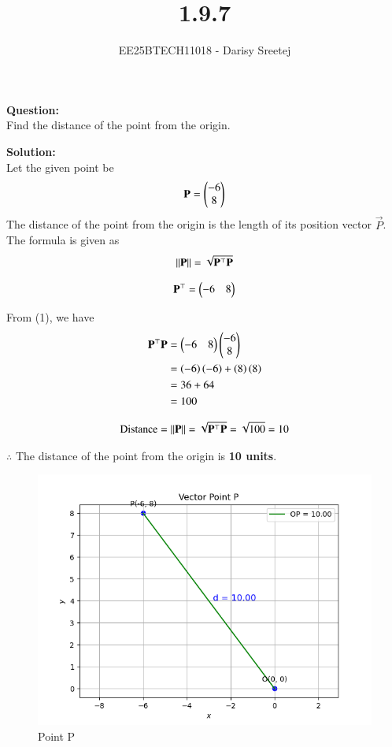 \documentclass[journal]{IEEEtran}
\begin{document}
\title{1.9.7}
\author{EE25BTECH11018 - Darisy Sreetej}
\maketitle

\textbf{Question:}\\
Find the distance of the point  from the origin.

\textbf{Solution:}\\
Let the given point be
\begin{align*}
    \mathbf{P} = \begin{pmatrix}-6 \\ 8\end{pmatrix}
\end{align*}
The distance of the point from the origin is the length of its position vector $\vec{P}$. The formula is given as 
\begin{align}
\left\lVert\mathbf{P}\right\rVert = \sqrt{\mathbf{P}^\top \mathbf{P}} \label{eq:1}
\end{align}

\begin{align*}
    \mathbf{P}^\top = \begin{pmatrix}-6 & 8\end{pmatrix}
\end{align*}

From (1), we have
\begin{align}
    \mathbf{P}^\top \mathbf{P} &= \begin{pmatrix}-6 & 8\end{pmatrix} \begin{pmatrix}-6 \\ 8\end{pmatrix} \\
    &= \left(-6\right)\left(-6\right) + \left(8\right)\left(8\right) \\
    &= 36 + 64 \\
    &= 100
\end{align}

\begin{align*}
    \text{Distance} = \left\lVert\mathbf{P}\right\rVert = \sqrt{\mathbf{P}^\top \mathbf{P}} = \sqrt{100} = 10
\end{align*}

$\therefore$ The distance of the point  from the origin is \textbf{10 units}.

\begin{figure}
    \centering
    \includegraphics[width=\columnwidth]{figs/fig.png}
    \caption*{Point P}
    \label{fig:fig}
\end{figure}
\end{document}
